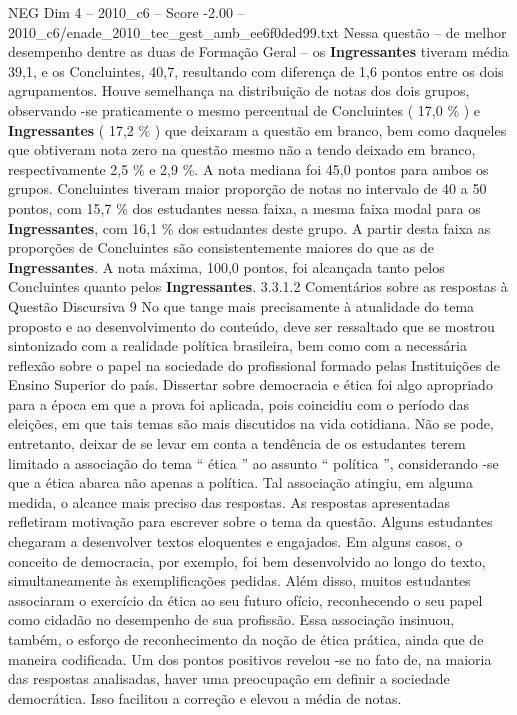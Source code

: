 \begin{textsample}{NEG Dim 4 – 2010\_c6 – Score -2.00 – 2010\_c6/enade\_2010\_tec\_gest\_amb\_ee6f0ded99.txt}
Nessa questão – de melhor desempenho dentre as duas de Formação Geral – os \textbf{Ingressantes} tiveram média 39,1, e os Concluintes, 40,7, resultando com diferença de 1,6 pontos entre os dois agrupamentos.
Houve semelhança na distribuição de notas dos dois grupos, observando -se praticamente o mesmo percentual de Concluintes ( 17,0 \% ) e \textbf{Ingressantes} ( 17,2 \% ) que deixaram a questão em branco, bem como daqueles que obtiveram nota zero na questão mesmo não a tendo deixado em branco, respectivamente 2,5 \% e 2,9 \%.
A nota mediana foi 45,0 pontos para ambos os grupos.
Concluintes tiveram maior proporção de notas no intervalo de 40 a 50 pontos, com 15,7 \% dos estudantes nessa faixa, a mesma faixa modal para os \textbf{Ingressantes}, com 16,1 \% dos estudantes deste grupo.
A partir desta faixa as proporções de Concluintes são consistentemente maiores do que as de \textbf{Ingressantes}.
A nota máxima, 100,0 pontos, foi alcançada tanto pelos Concluintes quanto pelos \textbf{Ingressantes}. 3.3.1.2 Comentários sobre as respostas à Questão Discursiva 9 No que tange mais precisamente à atualidade do tema proposto e ao desenvolvimento do conteúdo, deve ser ressaltado que se mostrou sintonizado com a realidade política brasileira, bem como com a necessária reflexão sobre o papel na sociedade do profissional formado pelas Instituições de Ensino Superior do país.
Dissertar sobre democracia e ética foi algo apropriado para a época em que a prova foi aplicada, pois coincidiu com o período das eleições, em que tais temas são mais discutidos na vida cotidiana.
Não se pode, entretanto, deixar de se levar em conta a tendência de os estudantes terem limitado a associação do tema “ ética ” ao assunto “ política ”, considerando -se que a ética abarca não apenas a política.
Tal associação atingiu, em alguma medida, o alcance mais preciso das respostas.
As respostas apresentadas refletiram motivação para escrever sobre o tema da questão.
Alguns estudantes chegaram a desenvolver textos eloquentes e engajados.
Em alguns casos, o conceito de democracia, por exemplo, foi bem desenvolvido ao longo do texto, simultaneamente às exemplificações pedidas.
Além disso, muitos estudantes associaram o exercício da ética ao seu futuro ofício, reconhecendo o seu papel como cidadão no desempenho de sua profissão.
Essa associação insinuou, também, o esforço de reconhecimento da noção de ética prática, ainda que de maneira codificada.
Um dos pontos positivos revelou -se no fato de, na maioria das respostas analisadas, haver uma preocupação em definir a sociedade democrática.
Isso facilitou a correção e elevou a média de notas.

\end{textsample}
